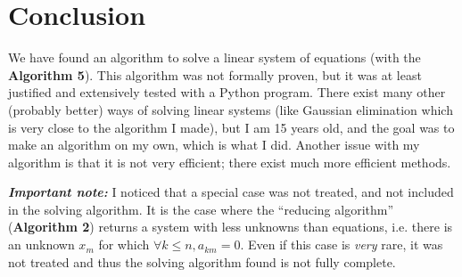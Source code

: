 \documentclass[11pt]{article}
\begin{document}
\section{Conclusion}

We have found an algorithm to solve a linear system of equations (with the \textbf{Algorithm 5}).
This algorithm was not formally proven, but it was at least justified and extensively tested with a Python program.
There exist many other (probably better) ways of solving linear systems (like Gaussian elimination which is very close to the algorithm I made), but I am 15 years old, and the goal was to make an algorithm on my own, which is what I did.
Another issue with my algorithm is that it is not very efficient; there exist much more efficient methods.

\vspace{2cm}

\textit{\textbf{Important note:}}
I noticed that a special case was not treated, and not included in the solving algorithm.
It is the case where the ``reducing algorithm'' (\textbf{Algorithm 2}) returns a system with less unknowns than equations, i.e. there is an unknown $x_m$ for which $\forall k \le n, a_{km} = 0$.
Even if this case is \textit{very} rare, it was not treated and thus the solving algorithm found is not fully complete.
\end{document}
